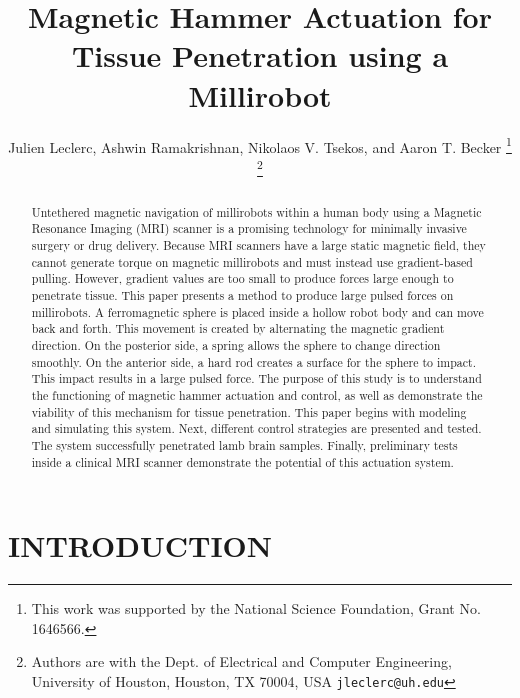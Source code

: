 \documentclass[letterpaper, 10 pt, conference]{ieeeconf}  %
\title{\LARGE \bf
Magnetic Hammer Actuation for Tissue Penetration using a Millirobot}
\author{Julien Leclerc, Ashwin Ramakrishnan, Nikolaos V. Tsekos, and Aaron T. Becker %
\thanks{This work was supported by the National Science Foundation, Grant No. 1646566. }%
\thanks{Authors are with the Dept. of Electrical and Computer
Engineering, University of Houston, Houston, TX 70004, USA
        {\tt\small jleclerc@uh.edu}}%
}
\begin{document}
\maketitle
\thispagestyle{empty}
\pagestyle{empty}


\begin{abstract}

Untethered magnetic navigation of millirobots within a human body using a Magnetic Resonance Imaging (MRI) scanner is a promising technology for minimally invasive surgery or drug delivery.
Because MRI scanners have a large static magnetic field, they cannot generate torque on magnetic millirobots and must instead use gradient-based pulling.
 However, gradient values are too small to produce forces large enough to penetrate tissue. 
 This paper presents a method to produce large pulsed forces on millirobots. 
 A ferromagnetic sphere is placed inside a hollow robot body and can move back and forth. 
 This movement is created by alternating the magnetic gradient direction. 
 On the posterior side, a spring allows the sphere to change direction smoothly. 
 On the anterior side, a hard rod creates a surface for the sphere to impact. 
 This impact results in a large pulsed force. 
 The purpose of this study is to understand the functioning of magnetic hammer actuation and control, as well as demonstrate the viability of this mechanism for tissue penetration.
 This paper begins with modeling and simulating this system. 
 Next, different control strategies are presented and tested. The system successfully penetrated lamb brain samples.
  Finally, preliminary tests inside a clinical MRI scanner demonstrate the potential of this actuation system. 

\end{abstract}


\section{INTRODUCTION}
\end{document}
